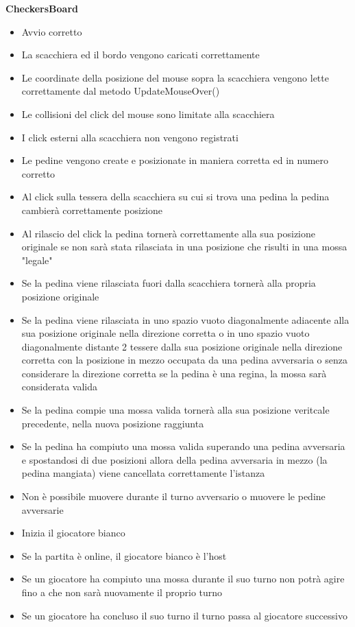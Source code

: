 \documentclass[12pt]{article}
\begin{document}
\textbf{\Large CheckersBoard}
\begin{itemize}
\item Avvio corretto
\item La scacchiera ed il bordo vengono caricati correttamente
\item Le coordinate della posizione del mouse sopra la scacchiera vengono lette correttamente dal metodo UpdateMouseOver()
\item Le collisioni del click del mouse sono limitate alla scacchiera
\item I click esterni alla scacchiera non vengono registrati
\item Le pedine vengono create e posizionate in maniera corretta ed in numero corretto
\item Al click sulla tessera della scacchiera su cui si trova una pedina la pedina cambierà correttamente posizione
\item Al rilascio del click la pedina tornerà correttamente alla sua posizione originale se non sarà stata rilasciata in una posizione che risulti in una mossa "legale"
\item Se la pedina viene rilasciata fuori dalla scacchiera tornerà alla propria posizione originale
\item Se la pedina viene rilasciata in uno spazio vuoto diagonalmente adiacente alla sua posizione originale nella direzione corretta o in uno spazio vuoto diagonalmente distante 2 tessere dalla sua posizione originale nella direzione corretta con la posizione in mezzo occupata da una pedina avversaria o senza considerare la direzione corretta se la pedina è una regina, la mossa sarà considerata valida
\item Se la pedina compie una mossa valida tornerà alla sua posizione veritcale precedente, nella nuova posizione raggiunta
\item Se la pedina ha compiuto una mossa valida superando una pedina avversaria e spostandosi di due posizioni allora della pedina avversaria in mezzo (la pedina mangiata) viene cancellata correttamente l'istanza
\item Non è possibile muovere durante il turno avversario o muovere le pedine avversarie
\item Inizia il giocatore bianco
\item Se la partita è online, il giocatore bianco è l'host
\item Se un giocatore ha compiuto una mossa durante il suo turno non potrà agire fino a che non sarà nuovamente il proprio turno
\item Se un giocatore ha concluso il suo turno il turno passa al giocatore successivo

\end{itemize}
\end{document}
